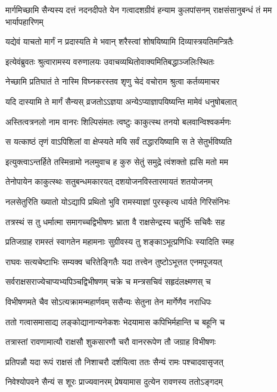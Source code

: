 \threelineshloka
{मार्गमिच्छामि सैन्यस्य दत्तं नदनदीपते}
{येन गत्वादशग्रीवं हन्याम कुलपांसनम्}
{राक्षसंसानुबन्धं तं मम भार्यापहारिणम्}


\twolineshloka
{यद्येवं याचतो मार्गं न प्रदास्यति मे भवान्}
{शरैस्त्वां शोषयिष्यामि दिव्यास्त्रयतिमन्त्रितैः}


\twolineshloka
{इत्येवंब्रुवतः श्रुत्वारामस्य वरुणालयः}
{उवाचव्यथितोवाक्यमितिबद्धाञ्जलिःस्थितः}


\twolineshloka
{नेच्छामि प्रतिघातं ते नास्मि विघ्नकरस्तव}
{शृणु चेदं वचोराम श्रुत्वा कर्तव्यमाचर}


\twolineshloka
{यदि दास्यामि ते मार्गं सैन्यस् व्रजतोऽऽज्ञया}
{अन्येऽप्याज्ञापयिष्यन्ति मामेवं धनुषोबलात्}


\twolineshloka
{अस्तित्वत्रनलो नाम वानरः शिल्पिसंमतः}
{त्वष्टुः काकुत्स्थ तनयो बलवान्विश्वकर्मणः}


\twolineshloka
{स यत्काष्ठं तृणं वाऽपिशिलां वा क्षेप्स्यते मयि}
{सर्वं तद्धारयिष्यामि स ते सेतुर्भविष्यति}


\twolineshloka
{इत्युक्त्वाऽन्तर्हिते तस्मिन्रामो नलमुवाच ह}
{कुरु सेतुं समुद्रे त्वंशक्तो ह्यसि मतो मम}


\twolineshloka
{तेनोपायेन काकुत्स्थः सतुबन्धमकारयत्}
{दशयोजनविस्तारमायतं शतयोजनम्}


\twolineshloka
{नलसेतुरिति ख्यातो योऽद्यापि प्रथितो भुवि}
{रामस्याज्ञां पुरस्कृत्य धार्यते गिरिसंनिभः}


\twolineshloka
{तत्रस्थं स तु धर्मात्मा समागच्चद्विभीषणः}
{भ्राता वै राक्षसेन्द्रस्य चतुर्भिः सचिवैः सह}


\twolineshloka
{प्रतिजग्राह रामस्तं स्वागतेन महामनाः}
{सुग्रीवस्य तु शङ्काऽभूत्प्रणिधिः स्यादिति स्मह}


\twolineshloka
{राघवः सत्यचेष्टाभिः सम्यक्व चरितेङ्गितैः}
{यदा तत्त्वेन तुष्टोऽभूत्तत एनमपूजयत्}


\twolineshloka
{सर्वराक्षसराज्येचाप्यभ्यपिञ्चद्विभीषणम्}
{चक्रे च मन्त्रसचिवं सहृदंलक्ष्मणस् च}


\twolineshloka
{विभीषणमते चैव सोऽत्यक्रामन्महार्णवम्}
{ससैन्यः सेतुना तेन मार्गेणैव नराधिपः}


\twolineshloka
{ततो गत्वासमासाद्य लङ्कोद्यानान्यनेकशः}
{भेदयामास कपिभिर्महान्ति च बहूनि च}


\twolineshloka
{तत्रास्तां रावणामात्यौ राक्षसौ शुकसारणौ}
{चरौ वानररूपेण तौ जग्राह विभीषणः}


\twolineshloka
{प्रतिपन्नौ यदा रूपं राक्षसं तौ निशाचरौ}
{दर्शयित्वा ततः सैन्यं रामः पश्चादवासृजत्}


\twolineshloka
{निवेश्योपवने सैन्यं स शूरः प्राज्यवानरम्}
{प्रेषयामास दुत्येन रावणस्य ततोऽङ्गदम्}


